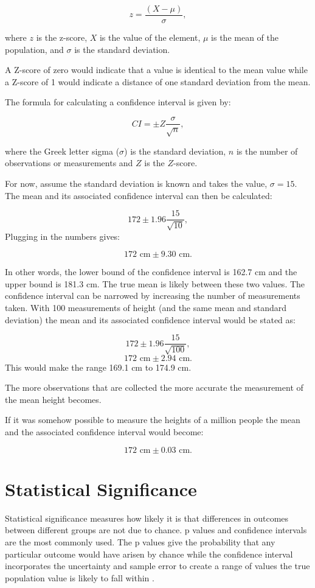 \documentclass[
]{book}
\begin{document}
\[z=\frac{(X-\mu)}{\sigma},\]

where \(z\) is the z-score, \(X\) is the value of the element, \(\mu\) is the mean of the population, and \(\sigma\) is the standard deviation.

A Z-score of zero would indicate that a value is identical to the mean value while a Z-score of 1 would indicate a distance of one standard deviation from the mean.

The formula for calculating a confidence interval is given by:

\[CI= \pm Z\frac{\sigma}{\sqrt{n}},\]

where the Greek letter sigma (\(\sigma\)) is the standard deviation, \(n\) is the number of observations or measurements and \(Z\) is the \(Z\)-score.

For now, assume the standard deviation is known and takes the value, \(\sigma = 15\). The mean and its associated confidence interval can then be calculated:

\[172 \pm 1.96 \frac{15}{\sqrt{10}},\]
Plugging in the numbers gives:

\[172 \textrm{ cm}\pm 9.30 \textrm{ cm}.\]

In other words, the lower bound of the confidence interval is 162.7 cm and the upper bound is 181.3 cm. The true mean is likely between these two values. The confidence interval can be narrowed by increasing the number of measurements taken. With 100 measurements of height (and the same mean and standard deviation) the mean and its associated confidence interval would be stated as:

\[172 \pm 1.96 \frac{15}{\sqrt{100}},\]
\[172 \textrm{ cm} \pm 2.94 \textrm{ cm}.\]
This would make the range 169.1 cm to 174.9 cm.

The more observations that are collected the more accurate the measurement of the mean height becomes.

If it was somehow possible to measure the heights of a million people the mean and the associated confidence interval would become:

\[172 \textrm{ cm} \pm 0.03 \textrm{ cm}.\]

\hypertarget{signif}{%
\section{Statistical Significance}\label{signif}}

Statistical significance measures how likely it is that differences in outcomes between different groups are not due to chance. p values and confidence intervals are the most commonly used. The p values give the probability that any particular outcome would have arisen by chance while the confidence interval incorporates the uncertainty and sample error to create a range of values the true population value is likely to fall within \citep{Leung201}.
\end{document}
